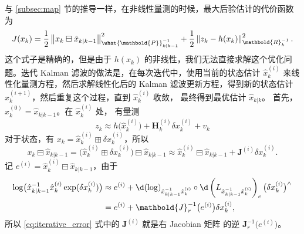 \documentclass[fontset=none,zihao=-4]{Notes}
\newcommand{\norm}[1]{\left\lVert#1\right\rVert}
\newcommand{\mat}[1]{\mathbold{#1}}
\begin{document}
与 \ref{subsec:map} 节的推导一样，在非线性量测的时候，最大后验估计的代价函数为
\begin{equation}\label{eq:nonlinear_cost}
  J(x_k)=\frac{1}{2}\norm{x_k\boxminus \hat x_{k|k-1}}_{\what{\mat P}_{k|k-1}^{-1}}^2+\frac{1}{2}\norm{z_k-h(x_k)}_{\mat R_k^{-1}}^2.
\end{equation}
这个式子是精确的，但是由于 $h(x_k)$ 的非线性，我们无法直接求解这个优化问题。迭代 Kalman 滤波的做法是，在每次迭代中，使用当前的状态估计 $\hat x_k^{(i)}$ 来线性化量测方程，然后求解线性化后的 Kalman 滤波更新方程，得到新的状态估计 $\hat x_k^{(i+1)}$，然后重复这个过程，直到 $\hat x_k^{(i)}$ 收敛，
最终得到最优估计 $\hat x_{k|k}$。
首先，$\hat x_k^{(0)}=\hat x_{k|k-1}$。在 $\hat x_k^{(i)}$ 处，
有量测
\begin{equation}\label{eq:iterative_measurement}
  z_k\approx h\bigl(\hat x_k^{(i)}\bigr)+\mat H_k^{(i)}\delta x_k^{(i)}+v_k
\end{equation}
对于状态，有 $x_k=\hat x_k^{(i)}\boxplus \delta x_k^{(i)}$，所以
\begin{equation}\label{eq:iterative_error}
  x_k\boxminus \hat x_{k|k-1}=\bigl(\hat x_k^{(i)}\boxplus \delta x_k^{(i)}\bigr)\boxminus \hat x_{k|k-1}\approx 
  \hat x_k^{(i)}\boxminus \hat x_{k|k-1}+ \mat J^{(i)} \delta x_k^{(i)}.
\end{equation}
记 $e^{(i)}=\hat x_k^{(i)}\boxminus \hat x_{k|k-1}$，由于
\begin{align*}
  \log\bigl(\hat x_{k|k-1}^{-1}\hat x_k^{(i)}\exp(\delta x_k^{(i)})\bigr)&\approx
  e^{(i)}+\d(\log)_{\hat x_{k|k-1}^{-1}\hat x_k^{(i)}}\circ 
  \d \left(L_{\hat x_{k|k-1}^{-1}\hat x_k^{(i)}}\right)_e\bigl(\delta x_k^{(i)}\bigr)^\wedge\\
  &= e^{(i)} + \mat J_r^{-1}\bigl(e^{(i)}\bigr) \delta x_k^{(i)},
\end{align*}
所以 \eqref{eq:iterative_error} 式中的 $\mat J^{(i)}$ 就是右 Jacobian 矩阵
的逆 $\mat J_r^{-1}\bigl(e^{(i)}\bigr)$。
\end{document}
